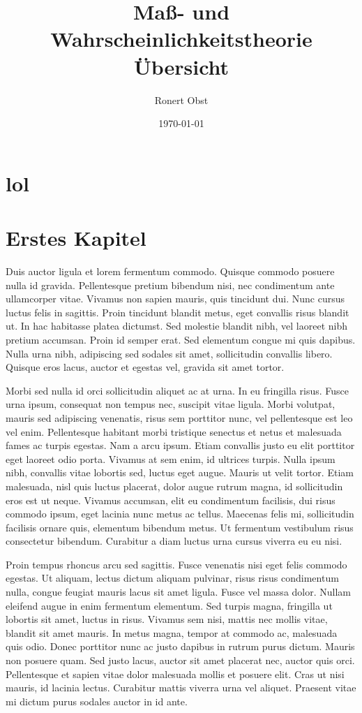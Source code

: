 \documentclass[english]{luaminiononecolumn}
\title{Maß- und Wahrscheinlichkeitstheorie Übersicht}
\author{Ronert Obst}
\date{\today}
\begin{document}
\maketitle

\setcounter{tocdepth}{3}
\tableofcontents
\vspace*{1cm}
\section{lol}
\label{sec-1}
\section{Erstes Kapitel}
\label{sec-2}

Duis auctor ligula et lorem fermentum commodo. Quisque commodo posuere nulla id gravida. Pellentesque pretium bibendum nisi, nec condimentum ante ullamcorper vitae. Vivamus non sapien mauris, quis tincidunt dui. Nunc cursus luctus felis in sagittis. Proin tincidunt blandit metus, eget convallis risus blandit ut. In hac habitasse platea dictumst. Sed molestie blandit nibh, vel laoreet nibh pretium accumsan. Proin id semper erat. Sed elementum congue mi quis dapibus. Nulla urna nibh, adipiscing sed sodales sit amet, sollicitudin convallis libero. Quisque eros lacus, auctor et egestas vel, gravida sit amet tortor.

Morbi sed nulla id orci sollicitudin aliquet ac at urna. In eu fringilla risus. Fusce urna ipsum, consequat non tempus nec, suscipit vitae ligula. Morbi volutpat, mauris sed adipiscing venenatis, risus sem porttitor nunc, vel pellentesque est leo vel enim. Pellentesque habitant morbi tristique senectus et netus et malesuada fames ac turpis egestas. Nam a arcu ipsum. Etiam convallis justo eu elit porttitor eget laoreet odio porta. Vivamus at sem enim, id ultrices turpis. Nulla ipsum nibh, convallis vitae lobortis sed, luctus eget augue. Mauris ut velit tortor. Etiam malesuada, nisl quis luctus placerat, dolor augue rutrum magna, id sollicitudin eros est ut neque. Vivamus accumsan, elit eu condimentum facilisis, dui risus commodo ipsum, eget lacinia nunc metus ac tellus. Maecenas felis mi, sollicitudin facilisis ornare quis, elementum bibendum metus. Ut fermentum vestibulum risus consectetur bibendum. Curabitur a diam luctus urna cursus viverra eu eu nisi.

Proin tempus rhoncus arcu sed sagittis. Fusce venenatis nisi eget felis commodo egestas. Ut aliquam, lectus dictum aliquam pulvinar, risus risus condimentum nulla, congue feugiat mauris lacus sit amet ligula. Fusce vel massa dolor. Nullam eleifend augue in enim fermentum elementum. Sed turpis magna, fringilla ut lobortis sit amet, luctus in risus. Vivamus sem nisi, mattis nec mollis vitae, blandit sit amet mauris. In metus magna, tempor at commodo ac, malesuada quis odio. Donec porttitor nunc ac justo dapibus in rutrum purus dictum. Mauris non posuere quam. Sed justo lacus, auctor sit amet placerat nec, auctor quis orci. Pellentesque et sapien vitae dolor malesuada mollis et posuere elit. Cras ut nisi mauris, id lacinia lectus. Curabitur mattis viverra urna vel aliquet. Praesent vitae mi dictum purus sodales auctor in id ante.
\end{document}

